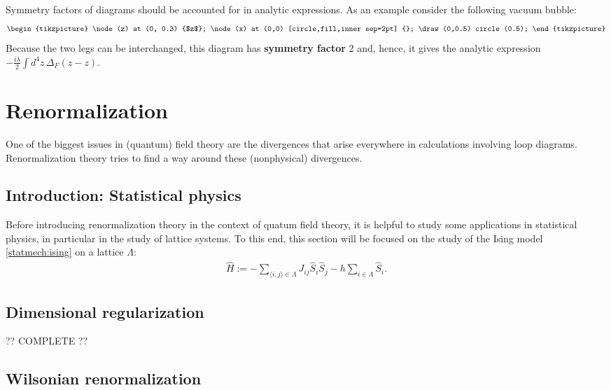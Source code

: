     \begin{remark}
        Symmetry factors of diagrams should be accounted for in analytic expressions. As an example consider the following vacuum bubble:
        \begin{gather*}
            \begin{tikzpicture}
                \node (z) at (0, 0.3) {$z$};
                \node (x) at (0,0) [circle,fill,inner sep=2pt] {};
                \draw (0,0.5) circle (0.5);
            \end{tikzpicture}
        \end{gather*}
        Because the two legs can be interchanged, this diagram has \textbf{symmetry factor} 2 and, hence, it gives the analytic expression $-\frac{i\lambda}{2}\int d^4z\,\Delta_F(z-z)$.
    \end{remark}

\section{Renormalization}

    One of the biggest issues in (quantum) field theory are the divergences that arise everywhere in calculations involving loop diagrams. Renormalization theory tries to find a way around these (nonphysical) divergences.

\subsection{Introduction: Statistical physics}

    Before introducing renormalization theory in the context of quatum field theory, it is helpful to study some applications in statistical physics, in particular in the study of lattice systems. To this end, this section will be focused on the study of the Ising model \ref{statmech:ising} on a lattice $\Lambda$:
    \begin{gather}
        \hat{H} := -\sum_{\langle i,j \rangle\in\Lambda}J_{ij}\hat{S}_i\hat{S}_j-h\sum_{i\in\Lambda}\hat{S}_i.
    \end{gather}

\subsection{Dimensional regularization}

    ?? COMPLETE ??

\subsection{Wilsonian renormalization}


